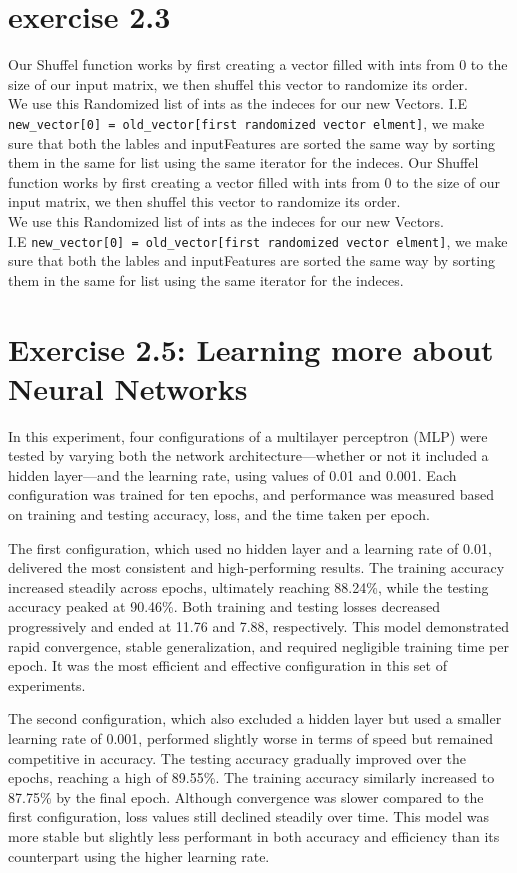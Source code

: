 \documentclass[a4paper]{article}
\begin{document}
\section*{exercise 2.3}
Our Shuffel function works by first creating a vector filled with ints from 0 to the size of our input matrix, we then shuffel this vector to randomize its order. \\
We use this Randomized list of ints as the indeces for our new Vectors. I.E \verb|new_vector[0] = old_vector[first randomized vector elment]|, we make sure that both the lables and inputFeatures are sorted the same way by sorting them in the same for list using the same iterator for the indeces.
Our Shuffel function works by first creating a vector filled with ints from 0 to the size of our input matrix, we then shuffel this vector to randomize its order. \\
We use this Randomized list of ints as the indeces for our new Vectors. \\I.E \verb|new_vector[0] = old_vector[first randomized vector elment]|, we make sure that both the lables and inputFeatures are sorted the same way by sorting them in the same for list using the same iterator for the indeces.

\section*{Exercise 2.5: Learning more about Neural Networks}
In this experiment, four configurations of a multilayer perceptron (MLP) were tested by varying both the network architecture—whether or not it included a hidden layer—and the learning rate, using values of 0.01 and 0.001. Each configuration was trained for ten epochs, and performance was measured based on training and testing accuracy, loss, and the time taken per epoch.

The first configuration, which used no hidden layer and a learning rate of 0.01, delivered the most consistent and high-performing results. The training accuracy increased steadily across epochs, ultimately reaching 88.24\%, while the testing accuracy peaked at 90.46\%. Both training and testing losses decreased progressively and ended at 11.76 and 7.88, respectively. This model demonstrated rapid convergence, stable generalization, and required negligible training time per epoch. It was the most efficient and effective configuration in this set of experiments.

The second configuration, which also excluded a hidden layer but used a smaller learning rate of 0.001, performed slightly worse in terms of speed but remained competitive in accuracy. The testing accuracy gradually improved over the epochs, reaching a high of 89.55\%. The training accuracy similarly increased to 87.75\% by the final epoch. Although convergence was slower compared to the first configuration, loss values still declined steadily over time. This model was more stable but slightly less performant in both accuracy and efficiency than its counterpart using the higher learning rate.
\end{document}
